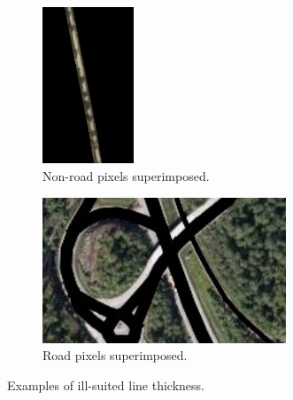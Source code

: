 \begin{figure}
\begin{subfigure}{0.5\textwidth}
\centering
\includegraphics[width=0.30\textwidth]{figs/illsuited_label.jpg}
\caption{Non-road pixels superimposed.} \label{fig:ill-suited_example1}
\end{subfigure}
\hspace*{\fill} %
\begin{subfigure}{0.5\textwidth}
\centering
\includegraphics[width=0.8\textwidth]{figs/illsuited_label2.jpg}
\caption{Road pixels superimposed.} \label{fig:ill-suited_example2}
\end{subfigure}

\caption[Examples of ill-suited line thickness]{Examples of ill-suited line thickness.} \label{fig:ill-suited}
\end{figure}
